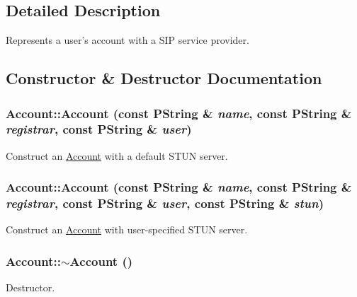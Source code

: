 \subsection{Detailed Description}
Represents a user's account with a SIP service provider. 

\subsection{Constructor \& Destructor Documentation}
\hypertarget{classAccount_8f195affd9f203c7bec7970c4702768f}{
\subsubsection[{Account}]{\setlength{\rightskip}{0pt plus 5cm}Account::Account (const PString \& {\em name}, \/  const PString \& {\em registrar}, \/  const PString \& {\em user})}}
\label{classAccount_8f195affd9f203c7bec7970c4702768f}


Construct an \hyperlink{classAccount}{Account} with a default STUN server. 

\hypertarget{classAccount_8325decb7b215b2860e3a4d7eaa72402}{
\subsubsection[{Account}]{\setlength{\rightskip}{0pt plus 5cm}Account::Account (const PString \& {\em name}, \/  const PString \& {\em registrar}, \/  const PString \& {\em user}, \/  const PString \& {\em stun})}}
\label{classAccount_8325decb7b215b2860e3a4d7eaa72402}


Construct an \hyperlink{classAccount}{Account} with user-specified STUN server. 

\hypertarget{classAccount_569c9ef0e42b9157690b4ceb646daba8}{
\subsubsection[{$\sim$Account}]{\setlength{\rightskip}{0pt plus 5cm}Account::$\sim$Account ()}}
\label{classAccount_569c9ef0e42b9157690b4ceb646daba8}


Destructor. 

